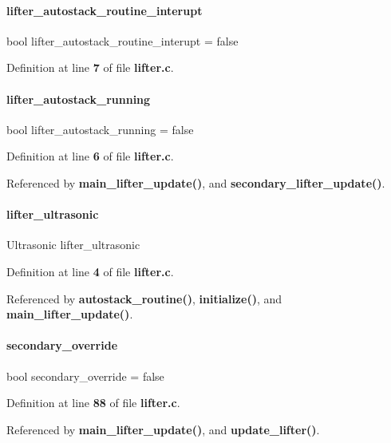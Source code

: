 \paragraph{lifter\+\_\+autostack\+\_\+routine\+\_\+interupt}
{\footnotesize\ttfamily bool lifter\+\_\+autostack\+\_\+routine\+\_\+interupt = false\hspace{0.3cm}{\ttfamily [static]}}



Definition at line \textbf{ 7} of file \textbf{ lifter.\+c}.

\mbox{\label{a00107_ae1fc3deab25f0b9e6f636bb83e9bf5c2}} 
\paragraph{lifter\+\_\+autostack\+\_\+running}
{\footnotesize\ttfamily bool lifter\+\_\+autostack\+\_\+running = false\hspace{0.3cm}{\ttfamily [static]}}



Definition at line \textbf{ 6} of file \textbf{ lifter.\+c}.



Referenced by \textbf{ main\+\_\+lifter\+\_\+update()}, and \textbf{ secondary\+\_\+lifter\+\_\+update()}.

\mbox{\label{a00107_a5dfaf05eb7e97b2e29d04eb068f9c240}} 
\paragraph{lifter\+\_\+ultrasonic}
{\footnotesize\ttfamily Ultrasonic lifter\+\_\+ultrasonic}



Definition at line \textbf{ 4} of file \textbf{ lifter.\+c}.



Referenced by \textbf{ autostack\+\_\+routine()}, \textbf{ initialize()}, and \textbf{ main\+\_\+lifter\+\_\+update()}.

\mbox{\label{a00107_ad0dce62ab81a71d1c53831e375cde64c}} 
\paragraph{secondary\+\_\+override}
{\footnotesize\ttfamily bool secondary\+\_\+override = false\hspace{0.3cm}{\ttfamily [static]}}



Definition at line \textbf{ 88} of file \textbf{ lifter.\+c}.



Referenced by \textbf{ main\+\_\+lifter\+\_\+update()}, and \textbf{ update\+\_\+lifter()}.

